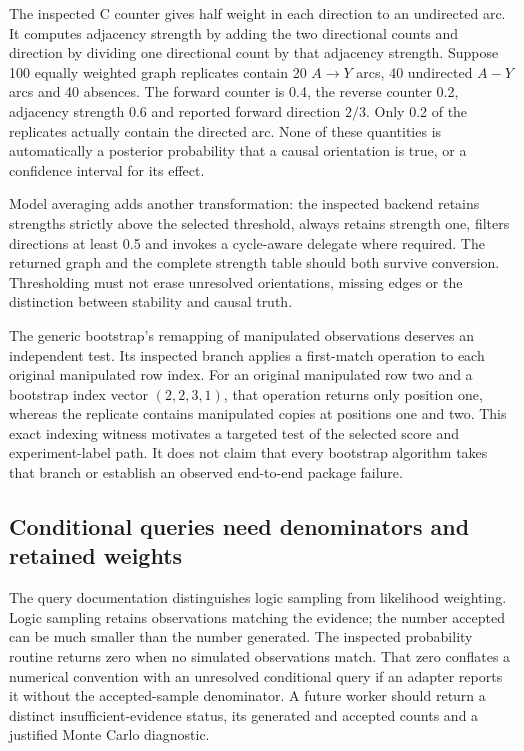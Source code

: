 The inspected C counter gives half weight in each direction to an undirected arc. It computes adjacency strength by adding the two directional counts and direction by dividing one directional count by that adjacency strength. Suppose 100 equally weighted graph replicates contain 20 $A\to Y$ arcs, 40 undirected $A-Y$ arcs and 40 absences. The forward counter is 0.4, the reverse counter 0.2, adjacency strength 0.6 and reported forward direction $2/3$. Only 0.2 of the replicates actually contain the directed arc. None of these quantities is automatically a posterior probability that a causal orientation is true, or a confidence interval for its effect.~\citep{exec24_bnlearn_sources,exec24_bnlearn_contract}

Model averaging adds another transformation: the inspected backend retains strengths strictly above the selected threshold, always retains strength one, filters directions at least 0.5 and invokes a cycle-aware delegate where required. The returned graph and the complete strength table should both survive conversion. Thresholding must not erase unresolved orientations, missing edges or the distinction between stability and causal truth.~\citep{exec24_bnlearn_sources,exec24_bnlearn_contract}

The generic bootstrap's remapping of manipulated observations deserves an independent test. Its inspected branch applies a first-match operation to each original manipulated row index. For an original manipulated row two and a bootstrap index vector $(2,2,3,1)$, that operation returns only position one, whereas the replicate contains manipulated copies at positions one and two. This exact indexing witness motivates a targeted test of the selected score and experiment-label path. It does not claim that every bootstrap algorithm takes that branch or establish an observed end-to-end package failure.~\citep{exec24_bnlearn_sources,exec24_bnlearn_contract}

\subsection{Conditional queries need denominators and retained weights}
The query documentation distinguishes logic sampling from likelihood weighting. Logic sampling retains observations matching the evidence; the number accepted can be much smaller than the number generated. The inspected probability routine returns zero when no simulated observations match. That zero conflates a numerical convention with an unresolved conditional query if an adapter reports it without the accepted-sample denominator. A future worker should return a distinct insufficient-evidence status, its generated and accepted counts and a justified Monte Carlo diagnostic.~\citep{exec24_bnlearn_sources,exec24_bnlearn_contract}

